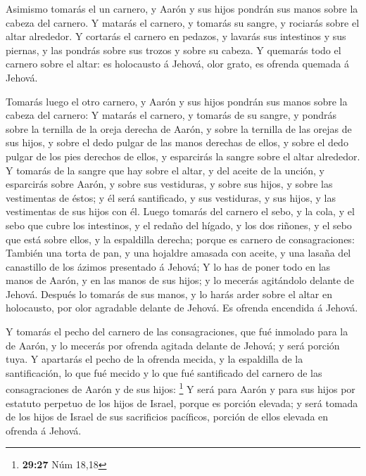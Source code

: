  Asimismo tomarás el un carnero, y Aarón y sus hijos
pondrán sus manos sobre la cabeza del carnero.  Y matarás
el carnero, y tomarás su sangre, y rociarás sobre el altar alrededor.
 Y cortarás el carnero en pedazos, y lavarás sus intestinos
y sus piernas, y las pondrás sobre sus trozos y sobre su cabeza.
 Y quemarás todo el carnero sobre el altar: es holocausto á
Jehová, olor grato, es ofrenda quemada á Jehová.

 Tomarás luego el otro carnero, y Aarón y sus hijos pondrán
sus manos sobre la cabeza del carnero:  Y matarás el
carnero, y tomarás de su sangre, y pondrás sobre la ternilla de la oreja
derecha de Aarón, y sobre la ternilla de las orejas de sus hijos, y
sobre el dedo pulgar de las manos derechas de ellos, y sobre el dedo
pulgar de los pies derechos de ellos, y esparcirás la sangre sobre el
altar alrededor.  Y tomarás de la sangre que hay sobre el
altar, y del aceite de la unción, y esparcirás sobre Aarón, y sobre sus
vestiduras, y sobre sus hijos, y sobre las vestimentas de éstos; y él
será santificado, y sus vestiduras, y sus hijos, y las vestimentas de
sus hijos con él.  Luego tomarás del carnero el sebo, y la
cola, y el sebo que cubre los intestinos, y el redaño del hígado, y los
dos riñones, y el sebo que está sobre ellos, y la espaldilla derecha;
porque es carnero de consagraciones:  También una torta de
pan, y una hojaldre amasada con aceite, y una lasaña del canastillo de
los ázimos presentado á Jehová;  Y lo has de poner todo en
las manos de Aarón, y en las manos de sus hijos; y lo mecerás agitándolo
delante de Jehová.  Después lo tomarás de sus manos, y lo
harás arder sobre el altar en holocausto, por olor agradable delante de
Jehová. Es ofrenda encendida á Jehová.

 Y tomarás el pecho del carnero de las consagraciones, que
fué inmolado para la de Aarón, y lo mecerás por ofrenda agitada delante
de Jehová; y será porción tuya.  Y apartarás el pecho de la
ofrenda mecida, y la espaldilla de la santificación, lo que fué mecido y
lo que fué santificado del carnero de las consagraciones de Aarón y de
sus hijos: \footnote{\textbf{29:27} Núm 18,18}  Y será para
Aarón y para sus hijos por estatuto perpetuo de los hijos de Israel,
porque es porción elevada; y será tomada de los hijos de Israel de sus
sacrificios pacíficos, porción de ellos elevada en ofrenda á Jehová.

